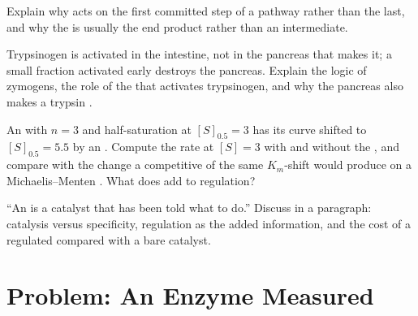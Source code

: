 \begin{exercise}[$\star\star$]\label{exo:b1:enzymes:9}
Explain why  acts on the first committed step of a
pathway rather than the last, and why the  is usually the
end product rather than an intermediate.
\end{exercise}

\begin{exercise}[$\star\star\star$]\label{exo:b1:enzymes:10}
Trypsinogen is activated in the intestine, not in the pancreas that
makes it; a small fraction activated early destroys the pancreas.
Explain the logic of zymogens, the role of the  that activates
trypsinogen, and why the pancreas also makes a trypsin .
\end{exercise}

\begin{exercise}[$\star\star\star$]\label{exo:b1:enzymes:11}
An  with $n = 3$ and half-saturation at $[S]_{0.5}
= 3$ has its curve shifted to $[S]_{0.5} = 5.5$ by an .
Compute the rate at $[S] = 3$ with and without the , and
compare with the change a competitive  of the same
$K_m$-shift would produce on a Michaelis--Menten . What does
 add to regulation?
\end{exercise}

\begin{exercise}[$\star\star\star$]\label{exo:b1:enzymes:12}
``An  is a catalyst that has been told what to do.'' Discuss in a
paragraph: catalysis versus specificity, regulation as the added
information, and the cost of a regulated  compared with a bare
catalyst.
\end{exercise}

\section{Problem: An Enzyme Measured}

